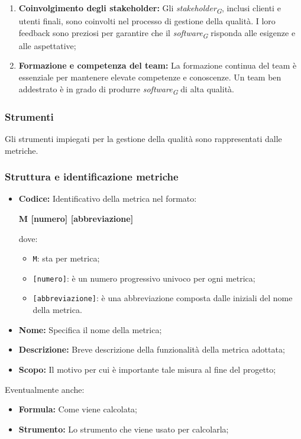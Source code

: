 \begin{enumerate}
    \item \textbf{Coinvolgimento degli stakeholder:}
        Gli \textit{stakeholder}\textsubscript{\textit{G}}, inclusi clienti e utenti finali, sono coinvolti nel processo di gestione della qualità. I loro feedback sono preziosi per garantire che il \textit{software}\textsubscript{\textit{G}} risponda alle esigenze e alle aspettative;

    \item \textbf{Formazione e competenza del team:}
        La formazione continua del team è essenziale per mantenere elevate competenze e conoscenze. Un team ben addestrato è in grado di produrre \textit{software}\textsubscript{\textit{G}} di alta qualità.
\end{enumerate}

\subsubsection{Strumenti}
Gli strumenti impiegati per la gestione della qualità sono rappresentati dalle metriche.

\subsubsection{Struttura e identificazione metriche}
\begin{itemize}
    \item \textbf{Codice:} Identificativo della metrica nel formato: 
        \begin{center}
            \textbf{M [numero] [abbreviazione]}
        \end{center}
        dove:
        \begin{itemize}
            \item \texttt{M}: sta per metrica;
            \item \texttt{[numero]}: è un numero progressivo univoco per ogni metrica; 
            \item \texttt{[abbreviazione]}: è una abbreviazione composta dalle iniziali del nome della metrica.
        \end{itemize}
    \item \textbf{Nome:} Specifica il nome della metrica;
    \item \textbf{Descrizione:} Breve descrizione della funzionalità della metrica adottata;
    \item \textbf{Scopo:}
        Il motivo per cui è importante tale misura al fine del progetto;

\end{itemize}
    \vspace{0.2cm}
    Eventualmente anche:
\begin{itemize}
    \item \textbf{Formula:} Come viene calcolata; 
    \item \textbf{Strumento:} Lo strumento che viene usato per calcolarla;
\end{itemize}

